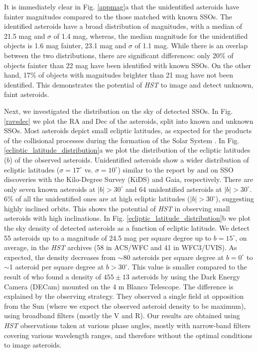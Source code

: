 \documentclass{aa}
\begin{document}
It is immediately clear in Fig. \ref{appmag}a that the unidentified asteroids have fainter magnitudes compared to the those matched with known SSOs. The identified asteroids have a broad distribution of magnitudes, with a median of 21.5 mag and $\sigma$ of 1.4 mag, whereas, the median magnitude for the unidentified objects is 1.6 mag fainter, 23.1 mag and $\sigma$ of 1.1 mag. While there is an overlap between the two distributions, there are significant differences: only 20\% of objects fainter than 22 mag have been identified with known SSOs. On the other hand, 17\% of objects with magnitudes brighter than 21 mag have not been identified. This demonstrates the potential of \textit{HST} to image and detect unknown, faint asteroids. 

Next, we investigated the distribution on the sky of detected SSOs. In Fig. \ref{ravsdec} we plot the RA and Dec of the asteroids, split into known and unknown SSOs. Most asteroids depict small ecliptic latitudes, as expected for the products of the collisional processes during the formation of the Solar System \citep{Morbidelli2015}. In Fig. \ref{ecliptic_latitude_distribution}a we plot the distribution of the ecliptic latitudes ($b$) of the observed asteroids. Unidentified asteroids show a wider distribution of ecliptic latitudes ($\sigma=17^{\circ}$ vs. $\sigma=10^{\circ}$) similar to the report by \citet{Mahlke2018_SSO} and \citet{Carry2021} on SSO discoveries with the Kilo-Degree Survey (KiDS) and Gaia, respectively. There are only seven known asteroids at $|b|>30^{\circ}$ and 64 unidentified asteroids at $|b|>30^{\circ}$. 6\% of all the unidentified ones are at high ecliptic latitudes ($|b|>30^{\circ}$), suggesting highly inclined orbits. This shows the potential of \textit{HST} in observing small asteroids with high inclinations. In Fig. \ref{ecliptic_latitude_distribution}b we plot the sky density of detected asteroids as a function of ecliptic latitude. We detect 55 asteroids up to a magnitude of 24.5 mag per square degree up to $b=15^{\circ}$, on average, in the \textit{HST} archives (58 in ACS/WFC and 41 in WFC3/UVIS). As expected, the density decreases from $\sim$80 asteroids per square degree at $b=0^{\circ}$ to $\sim$1 asteroid per square degree at $b>30^{\circ}$. This value is smaller compared to the result of \cite{Heinze2019} who found a density of $455\pm13$ asteroids by using the Dark Energy Camera (DECam) mounted on the 4 m Blanco Telescope. The difference is explained by the observing strategy. They observed a single field at opposition from the Sun (where we expect the observed asteroid density to be maximum), using broadband filters (mostly the V and R). Our results are obtained using \textit{HST} observations taken at various phase angles, mostly with narrow-band filters covering various wavelength ranges, and therefore without the optimal conditions to image asteroids.
\end{document}
